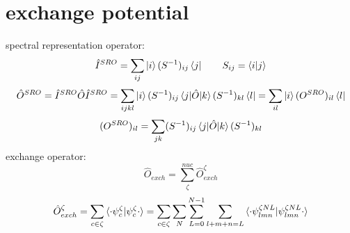 \documentclass{article}
\begin{document}
\section{exchange potential}
	spectral representation operator:\\
	\begin{displaymath}
		\hat{I}^{SRO}=\sum_{ij} \ket{i} (S^{-1})_{ij} \bra{j} \qquad S_{ij}=\braket{i|j}
	\end{displaymath}
	\begin{displaymath}
		\hat{O}^{SRO}=\hat{I}^{SRO} \hat{O} \hat{I}^{SRO} 
		=\sum_{ijkl} \ket{i} (S^{-1})_{ij} \braket{j|\hat{O}|k} (S^{-1})_{kl} \bra{l}
		=\sum_{il} \ket{i} (O^{SRO})_{il} \bra{l}
	\end{displaymath}
	\begin{displaymath}
		(O^{SRO})_{il}=\sum_{jk} (S^{-1})_{ij} \braket{j|\hat{O}|k} (S^{-1})_{kl}
	\end{displaymath}
	exchange operator:\\
	\begin{displaymath}
		\hat{O}_{exch}=\sum_{\zeta}^{nuc} \hat{O}^{\zeta}_{exch}
	\end{displaymath}
	\begin{displaymath}
		\hat{O}^{\zeta}_{exch}=\sum_{c\in\zeta} \braket{\cdot\psi_c^{\zeta}|\psi_c^{\zeta}\cdot}
		=\sum_{c\in\zeta} \sum_N \sum_{L=0}^{N-1} \sum_{l+m+n=L} 
		\braket{\cdot\psi_{lmn}^{\zeta NL}|\psi_{lmn}^{\zeta NL}\cdot}
	\end{displaymath}
\end{document}
